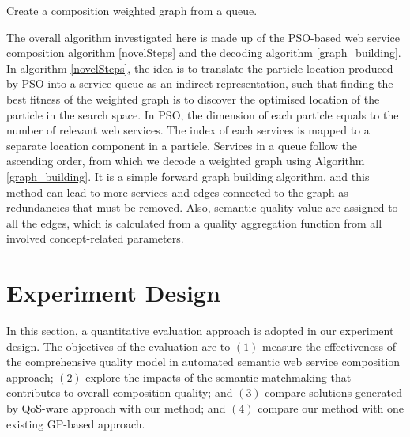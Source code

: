\documentclass{IEEEtran}
\begin{document}
\begin{algorithm}
 \setlength{}
 \LinesNumbered
 \SetNlSty{}{}{:}
 \caption{Create a composition weighted graph from a queue.}
\label{graph_building}
\end{algorithm} 


The overall algorithm investigated here is made up of the PSO-based web service composition algorithm \ref{novelSteps} and the decoding algorithm \ref{graph_building}. In algorithm \ref{novelSteps}, the idea is to translate the particle location produced by PSO into a service queue as an indirect representation, such that finding the best fitness of the weighted graph is to discover the optimised location of the particle in the search space. In PSO, the dimension of each particle equals to the number of relevant web services. The index of each services is mapped to a separate location component in a particle. Services in a queue follow the ascending order, from which we decode a weighted graph using Algorithm \ref{graph_building}. It is a simple forward graph building algorithm, and this method can lead to more services and edges connected to the graph as redundancies that must be removed. Also, semantic quality value are assigned to all the edges, which is calculated from a quality aggregation function from all involved concept-related parameters.


\section{Experiment Design}\label{experiment_design}
In this section, a quantitative evaluation approach is adopted in our experiment design. The objectives of the evaluation are to $(1)$ measure the effectiveness of the comprehensive quality model in automated semantic web service composition approach; $(2)$ explore the impacts of the semantic matchmaking that contributes to overall composition quality; and $(3)$ compare solutions generated by QoS-ware approach with our method; and $(4)$ compare our method with one existing GP-based approach.
\end{document}
